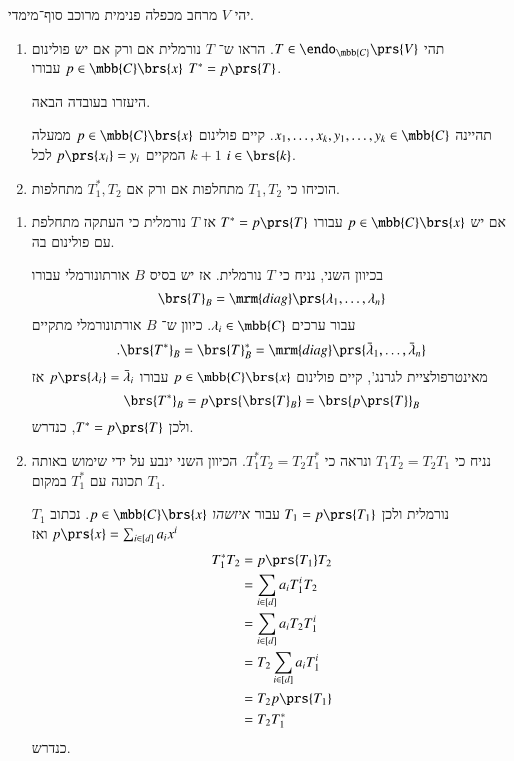 \documentclass[a4paper,10pt,oneside,openany]{article}
\begin{document}
\begin{exercise}%
יהי
$V$
מרחב מכפלה פנימית מרוכב סוף־מימדי.

\begin{enumerate}
\item

תהי
$T \in \endo_{\mbb{C}}\prs{V}$.
הראו ש־%
$T$
נורמלית אם ורק אם יש פולינום
$p \in \mbb{C}\brs{x}$
עבורו
$T^* = p\prs{T}$.

היעזרו בעובדה הבאה.

\begin{theorem}
תהיינה
$x_1, \ldots, x_k, y_1, \ldots, y_k \in \mbb{C}$.
קיים פולינום
$p \in \mbb{C}\brs{x}$
ממעלה
$k+1$
המקיים
$p\prs{x_i} = y_i$
לכל
$i \in \brs{k}$.
\end{theorem}

\item

הוכיחו כי
$T_1, T_2$
מתחלפות אם ורק אם
$T_1^*, T_2$
מתחלפות.
\end{enumerate}
\end{exercise}

\begin{solution}
\begin{enumerate}
\item אם יש
$p \in \mbb{C}\brs{x}$
עבורו
$T^* = p\prs{T}$
אז
$T$
נורמלית כי העתקה מתחלפת עם פולינום בה.

בכיוון השני, נניח כי
$T$
נורמלית.
אז יש בסיס
$B$
אורתונורמלי עבורו
\[\brs{T}_B = \mrm{diag}\prs{\lambda_1, \ldots, \lambda_n}\]
עבור ערכים
$\lambda_i \in \mbb{C}$.
כיוון ש־%
$B$
אורתונורמלי מתקיים
\[\text{.}\brs{T^*}_B = \brs{T}_B^* = \mrm{diag}\prs{\bar{\lambda}_1, \ldots, \bar{\lambda}_n}\]
מאינטרפולציית לגרנג', קיים פולינום
$p \in \mbb{C}\brs{x}$
עבורו
$p\prs{\lambda_i} = \bar{\lambda}_i$
אז
\[\brs{T^*}_B = p\prs{\brs{T}_B} = \brs{p\prs{T}}_B\]
ולכן
$T^* = p\prs{T}$,
כנדרש.

\item נניח כי
$T_1 T_2 = T_2 T_1$
ונראה כי
$T_1^* T_2 = T_2 T_1^*$.
הכיוון השני ינבע על ידי שימוש באותה תכונה עם
$T_1^*$
במקום
$T_1$.

$T_1$
נורמלית ולכן
$T_1 = p\prs{T_1}$
עבור \emph{איזשהו}
$p \in \mbb{C}\brs{x}$.
נכתוב
$p\prs{x} = \sum_{i \in [d]} a_i x^i$
ואז
\begin{align*}
T_1^* T_2 &= p\prs{T_1} T_2
\\&= \sum_{i \in [d]} a_i T_1^i T_2
\\&= \sum_{i \in [d]} a_i T_2 T_1^i
\\&= T_2 \sum_{i \in [d]} a_i T_1^i
\\&= T_2 p\prs{T_1}
\\&= T_2 T_1^*
\end{align*}
כנדרש.
\end{enumerate}
\end{solution}
\end{document}

